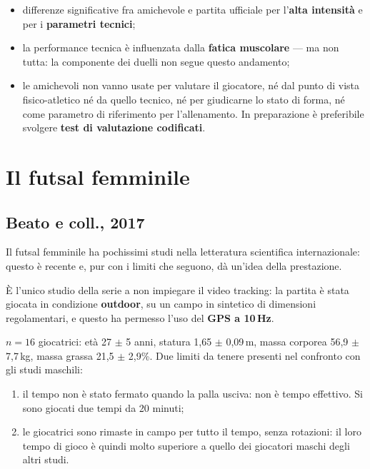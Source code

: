 \begin{itemize}
  \item differenze significative fra amichevole e partita ufficiale per l'\textbf{alta intensità} e
    per i \textbf{parametri tecnici};
  \item la performance tecnica è influenzata dalla \textbf{fatica muscolare} --- ma non tutta: la
    componente dei duelli non segue questo andamento;
  \item le amichevoli non vanno usate per valutare il giocatore, né dal punto di vista
    fisico-atletico né da quello tecnico, né per giudicarne lo stato di forma, né come parametro di
    riferimento per l'allenamento. In preparazione è preferibile svolgere \textbf{test di
    valutazione codificati}.
\end{itemize}

\section{Il futsal femminile}

\subsection{Beato e coll., 2017}

Il futsal femminile ha pochissimi studi nella letteratura scientifica internazionale: questo è
recente e, pur con i limiti che seguono, dà un'idea della prestazione.

È l'unico studio della serie a non impiegare il video tracking: la partita è stata giocata in
condizione \textbf{outdoor}, su un campo in sintetico di dimensioni regolamentari, e questo ha
permesso l'uso del \textbf{GPS a 10\,Hz}.

$n = 16$ giocatrici: età 27 $\pm$ 5 anni, statura 1,65 $\pm$ 0,09\,m, massa corporea 56,9 $\pm$
7,7\,kg, massa grassa 21,5 $\pm$ 2,9\%. Due limiti da tenere presenti nel confronto con gli studi
maschili:
\begin{enumerate}
  \item il tempo non è stato fermato quando la palla usciva: non è tempo effettivo. Si sono giocati
    due tempi da 20 minuti;
  \item le giocatrici sono rimaste in campo per tutto il tempo, senza rotazioni: il loro tempo di
    gioco è quindi molto superiore a quello dei giocatori maschi degli altri studi.
\end{enumerate}

